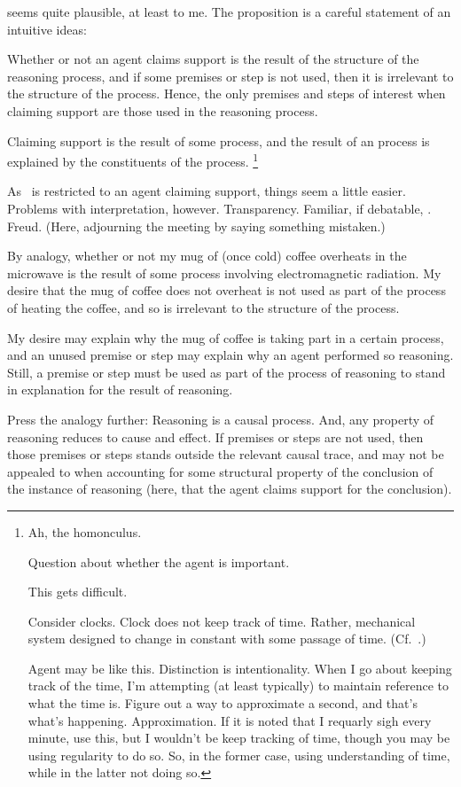 \begin{note}[Intuition]
  \ESU{} seems quite plausible, at least to me.
  The proposition is a careful statement of an intuitive ideas:

  Whether or not an agent claims support is the result of the structure of the reasoning process, and if some premises or step is not used, then it is irrelevant to the structure of the process.
  Hence, the only premises and steps of interest when claiming support are those used in the reasoning process.

  Claiming support is the result of some process, and the result of an process is explained by the constituents of the process.\nolinebreak
  \footnote{
    Ah, the homonculus.

    Question about whether the agent is important.

    This gets difficult.

    Consider clocks.
    Clock does not keep track of time.
    Rather, mechanical system designed to change in constant with some passage of time. (Cf.\ \textcite{Smith:1988aa}.)

    Agent may be like this.
    Distinction is intentionality.
    When I go about keeping track of the time, I'm attempting (at least typically) to maintain reference to what the time is.
    Figure out a way to approximate a second, and that's what's happening.
    Approximation.
    If it is noted that I requarly sigh every minute, use this, but I wouldn't be keep tracking of time, though you may be using regularity to do so.
    So, in the former case, using understanding of time, while in the latter not doing so.
  }

  As~\ESU{} is restricted to an agent claiming support, things seem a little easier.
  Problems with interpretation, however.
  Transparency.
  Familiar, if debatable, .
  Freud.
  (Here, adjourning the meeting by saying something mistaken.)
\end{note}

\begin{note}[Analogy]
  By analogy, whether or not my mug of (once cold) coffee overheats in the microwave is the result of some process involving electromagnetic radiation.
  My desire that the mug of coffee does not overheat is not used as part of the process of heating the coffee, and so is irrelevant to the structure of the process.

  My desire may explain why the mug of coffee is taking part in a certain process, and an unused premise or step may explain why an agent performed so reasoning.
  Still, a premise or step must be used as part of the process of reasoning to stand in explanation for the result of reasoning.

  Press the analogy further: Reasoning is a causal process.
  And, any property of reasoning reduces to cause and effect.
  If premises or steps are not used, then those premises or steps stands outside the relevant causal trace, and may not be appealed to when accounting for some structural property of the conclusion of the instance of reasoning (here, that the agent claims support for the conclusion).
\end{note}

